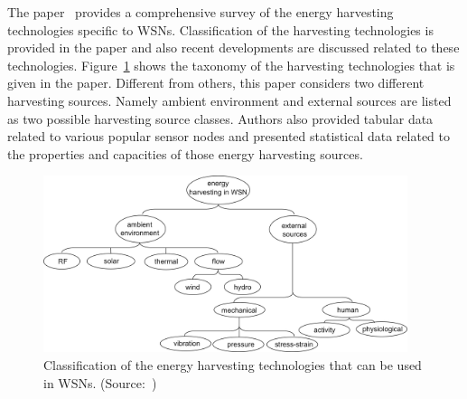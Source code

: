 \documentclass[12pt, oneandhalf, chaparabic, sees, ms]{metu}
\begin{document}
The paper~\cite{shaikh2016} provides a comprehensive survey of the energy harvesting technologies specific to WSNs. Classification of the harvesting technologies is
provided in the paper and also recent developments are discussed related to these technologies. Figure~\ref{fig:energy-tax4} shows the taxonomy of the harvesting
technologies that is given in the paper. Different from others, this paper considers two different harvesting sources. 
Namely ambient environment and external sources are listed as two possible harvesting source classes. Authors also provided tabular data related to various
popular sensor nodes and presented statistical data related to the properties and capacities of those energy harvesting sources.
% 
%
%
\begin{figure}[!htbp]
 \begin{center}
  \includegraphics[width=0.95\textwidth]{energy-tax4.png}
 \end{center}
 \caption{Classification of the energy harvesting technologies that can be used in WSNs. (Source:~\protect\cite{shaikh2016})}
  \label{fig:energy-tax4}
\end{figure}
% 
%
%
\end{document}
